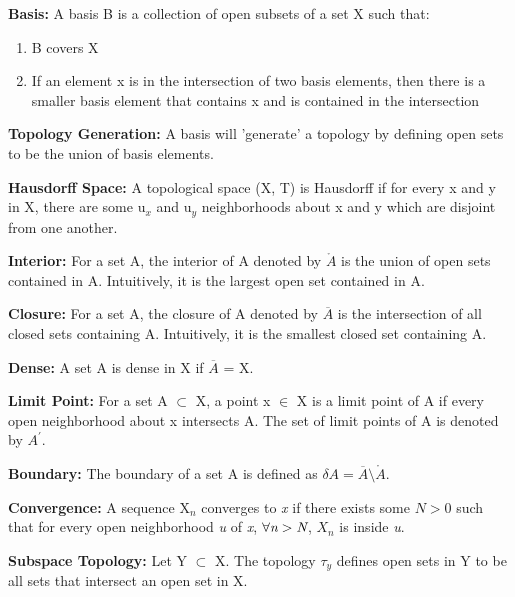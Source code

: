 \documentclass[letterpaper,12pt]{article}
\begin{document}
	\textbf{Basis:}
		A basis B is a collection of open subsets of a set X such that:
		\begin{enumerate}
			\item B covers X

			\item If an element x is in the intersection of two basis elements, then there is a smaller basis element that contains x and is contained in the intersection
		\end{enumerate}

	\textbf{Topology Generation:}
		A basis will 'generate' a topology by defining open sets to be the union of basis elements.
	\newline{}

	\textbf{Hausdorff Space:}
		A topological space (X, T) is Hausdorff if for every x and y in X, there are some u$_{x}$ and u$_{y}$ neighborhoods about x and y which are disjoint from one another.
	\newline{}

	\textbf{Interior:}
		For a set A, the interior of A denoted by $\mathring{A}$ is the union of open sets contained in A. Intuitively, it is the largest open set contained in A.
	\newline{}

	\textbf{Closure:}
		For a set A, the closure of A denoted by $\overline{A}$ is the intersection of all closed sets containing A. Intuitively, it is the smallest closed set containing A.
	\newline{}

	\textbf{Dense:}
		A set A is dense in X if $\overline{A}$ = X.
	\newline{}

	\textbf{Limit Point:}
		For a set A $\subset$ X, a point x $\in$ X is a limit point of A if every open neighborhood about x intersects A. The set of limit points of A is denoted by $A^{\prime}$.
	\newline{}

	\textbf{Boundary:}
		The boundary of a set A is defined as $\delta A = \overline{A}\setminus\mathring{A}$.
	\newline{}

	\textbf{Convergence:}
		A sequence {X$_{n}$} converges to \emph{x} if there exists some $N>0$ such that for every open neighborhood \emph{u} of \emph{x}, $\forall\emph{n} > \emph{N}$, $X_{n}$ is inside \emph{u}.
	\newline{}

	\textbf{Subspace Topology:}
		Let Y $\subset$ X. The topology $\tau_{y}$ defines open sets in Y to be all sets that intersect an open set in X.
	\newline{}
\end{document}
